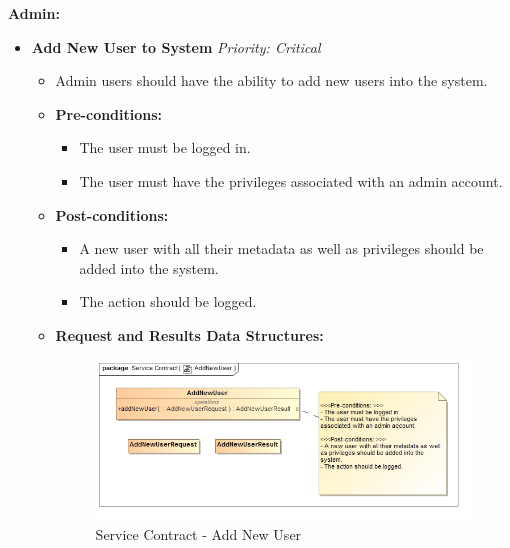 \documentclass{article}
\begin{document}
				\cleardoublepage
				\textbf{Admin:}
				
				\begin{itemize}
					\item \textbf{Add New User to System} \hfill \textit{Priority: Critical}
					\begin{itemize}
						\item Admin users should have the ability to add new users into the system.
						\item \textbf{Pre-conditions:}
						\begin{itemize}
							\item The user must be logged in.
							\item The user must have the privileges associated with an admin account.
						\end{itemize}
						\item \textbf{Post-conditions:}
						\begin{itemize}
							\item A new user with all their metadata as well as privileges should be added into the system.
							\item The action should be logged.
						\end{itemize}
						\item \textbf{Request and Results Data Structures:}
						\begin{figure}[H]
							\includegraphics[width=\linewidth]{../Diagrams/ServiceContracts/AddNewUser.jpg}
							\caption{Service Contract - Add New User}
						\end{figure}
					\end{itemize}
					

\end{itemize}
\end{document}
